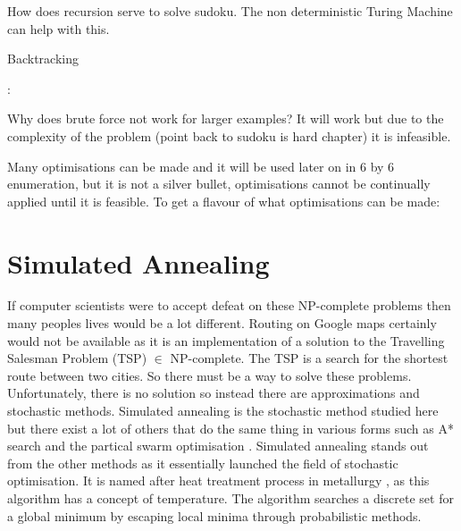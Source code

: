 \documentclass[a4paper,11pt]{report}
\newcounter{row}
\newcounter{col}
\begin{document}
How does recursion serve to solve sudoku. The non deterministic Turing Machine can help with this.

\begin{algorithm}
\caption{Backtracking}
\begin{algorithmic}
                \Else:
	       \EndIf
		\EndIf
\EndIf
\EndFor
\EndFor
\EndProcedure						
\end{algorithmic}
\end{algorithm}

Why does brute force not work for larger examples? It will work but due to the complexity of the problem (point back to sudoku is hard chapter) it is infeasible.

Many optimisations can be made and it will be used later on in 6 by 6 enumeration, but it is not a silver bullet, optimisations cannot be continually applied until it is feasible. To get a flavour of what optimisations can be made:

\section{Simulated Annealing} 

If computer scientists were to accept defeat on these NP-complete problems then many peoples lives would be a lot different. Routing on Google maps certainly would not be available as it is an implementation of a solution to the Travelling Salesman Problem (TSP) $\in$ NP-complete. The TSP is a search for the shortest route between two cities. So there must be a way to solve these problems. Unfortunately, there is no solution so instead there are approximations and stochastic methods. Simulated annealing is the stochastic method studied here but there exist a lot of others that do the same thing in various forms such as A* search and the partical swarm optimisation \cite{}. Simulated annealing stands out from the other methods as it essentially launched the field of stochastic optimisation. \cite{} It is named after heat treatment process in metallurgy \cite{}, as this algorithm has a concept of temperature. The algorithm searches a discrete set for a global minimum by escaping local minima through probabilistic methods.
\end{document}
